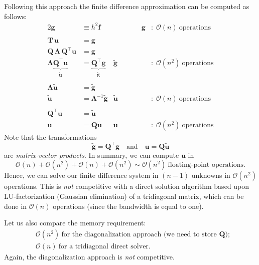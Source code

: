 Following this approach the finite difference approximation can be computed as
follows:
\begin{alignat*}{2}
  \bm g &\equiv  h^2 \bm f \quad &  \qquad \qquad \bm g
  &: \; \mathcal{O}(n) ~ \text{operations} \\
  \\
  \bm T \, \bm u &= \bm g \\
  \bm Q \, \bm \Lambda \, \bm Q^\intercal \bm u &= \bm g \\
  \bm \Lambda \underbrace{\bm Q^\intercal \bm u}_{\tilde{\bm u}}
  &= \underbrace{\bm Q^\intercal \bm g}_{\tilde{\bm g}}
  & \tilde{\bm g} &: \; \mathcal{O}(n^2) ~ \text{operations} \\
  \\
  \bm \Lambda \tilde{\bm u} &= \tilde{\bm g} \\
  \tilde{\bm u} &= \bm \Lambda^{-1} \tilde{\bm g}
  & \tilde{\bm u} &: \; \mathcal{O}(n) ~ \text{operations} \\
  \\
  \bm Q^\intercal \bm u &= \tilde{\bm u} \\
  \bm u &= \bm Q \tilde{\bm u} & \bm u
  &: \; \mathcal{O}(n^2) ~ \text{operations}
\end{alignat*}
Note that the transformations
\begin{equation*}
  \tilde{\bm g} = \bm Q^\intercal \bm g \quad \text{and} \quad \bm u = \bm Q \tilde{\bm u}
\end{equation*}
are \emph{matrix-vector products}. In summary, we can compute $\bm u$ in
\begin{equation*}
  \mathcal{O}(n) + \mathcal{O}(n^2) + \mathcal{O}(n) + \mathcal{O}(n^2)
  \sim \mathcal{O}(n^2) ~ \text{floating-point operations}.
\end{equation*}
Hence, we can solve our finite difference system in $(n-1)$ unknowns in
$\mathcal{O}(n^2)$ operations. This is \emph{not} competitive with a direct
solution algorithm based upon LU-factorization (Gaussian elimination) of a
tridiagonal matrix, which can be done in $\mathcal{O}(n)$ operations (since the
bandwidth is equal to one).

Let us also compare the memory requirement:
\begin{align*}
  &\mathcal{O}(n^2) ~\text{for the diagonalization approach
  (we need to store $\bm Q$)}; \\
  &\mathcal{O}(n) ~\text{for a tridiagonal direct solver}.
\end{align*}
Again, the diagonalization approach is {\em not} competitive.

